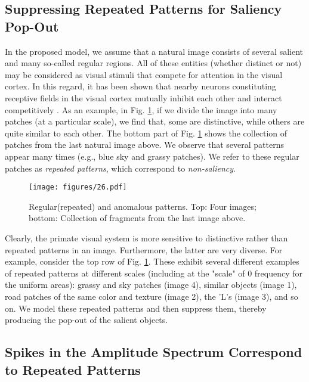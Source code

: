 \documentclass[10pt,journal,cspaper,compsoc]{IEEEtran}
\begin{document}
\subsection{Suppressing Repeated Patterns for Saliency Pop-Out}

In the proposed model, we assume that a natural image consists of several salient and many so-called regular regions. All of these entities (whether distinct or not) may be considered as visual stimuli that compete for attention in the visual cortex. In this regard, it has been shown that nearby neurons  constituting receptive fields in the visual cortex mutually inhibit each other and interact competitively \cite{duncan1989visual}. As an example, in Fig. \ref{fig:repeatPatt}, if we divide the image into many patches (at a particular scale), we find that, some  are distinctive, while others are quite similar to each other. The bottom part of  Fig. \ref{fig:repeatPatt} shows the collection of patches from the last natural image above. We observe that several patterns appear many times (e.g., blue sky and grassy patches). We refer to these regular patches  as {\it repeated patterns}, which correspond to {\it non-saliency}.

\begin{figure}[t]
\begin{center}

   \texttt{[image: figures/26.pdf]}
\end{center}
   \caption{Regular(repeated) and anomalous patterns. Top: Four images; bottom: Collection of fragments from the last image above.}
\label{fig:repeatPatt}
\end{figure}

Clearly, the primate visual system is more sensitive to distinctive rather than repeated patterns in an image.  Furthermore, the latter are very diverse. For example, consider the top row of Fig. \ref{fig:repeatPatt}. These exhibit several different examples of repeated patterns at different scales (including at the "scale" of 0 frequency for the uniform areas): grassy and sky patches (image 4), similar objects (image 1), road patches of the same color and texture (image 2), the 'L's (image 3), and so on. We model these repeated patterns and then suppress them, thereby producing the pop-out of the salient objects.


\subsection{Spikes in the Amplitude Spectrum Correspond to Repeated Patterns}
\end{document}
